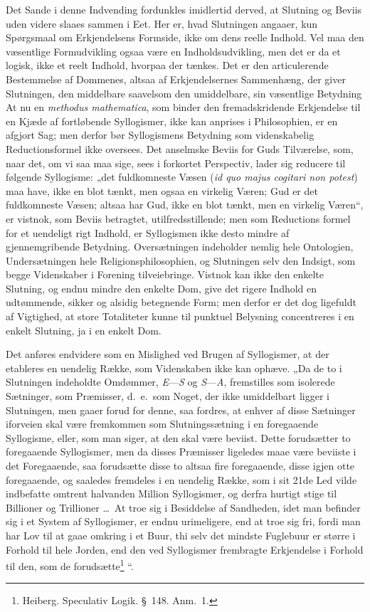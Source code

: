 \documentclass[12pt]{book}
\newcommand{\opage}[1]{\marginnote{\footnotesize\textit{[#1]}}}
\begin{document}
Det Sande i denne Indvending fordunkles imidlertid derved, at Slutning og Beviis uden videre slaaes sammen i Eet. Her er, hvad Slutningen angaaer, kun Spørgsmaal om Erkjendelsens Formside, ikke om dens reelle Indhold. Vel maa den væsentlige Formudvikling ogsaa være en Indholdsudvikling, men det er da et logisk, ikke et reelt Indhold, hvorpaa der tænkes. Det er den articulerende Bestemmelse af Dommenes, altsaa af Erkjendelsernes Sammenhæng, der giver Slutningen, den middelbare saavelsom den umiddelbare, sin væsentlige Betydning At nu%
{} en \textit{methodus mathematica}, som binder den fremadskridende Erkjendelse til en Kjæde af fortløbende Syllogismer, ikke kan anprises i Philosophien, er en afgjort Sag; men derfor bør Syllogismens Betydning som videnskabelig Reductionsformel ikke oversees. Det anselmske Beviis for Guds Tilværelse, som, naar det, om vi saa maa sige, sees i forkortet Perspectiv, lader sig reducere til følgende Syllogisme: „det fuldkomneste Væsen (\textit{id quo majus cogitari non potest}) maa have, ikke en blot tænkt, men ogsaa en virkelig Væren; Gud er det fuldkomneste Væsen; altsaa har Gud, ikke en blot tænkt, men en virkelig Væren“, er vistnok, som Beviis betragtet, utilfredsstillende; men som Reductions%
\opage{326}formel for et uendeligt rigt Indhold, er Syllogismen ikke desto mindre af gjennemgribende Betydning. Oversætningen indeholder nemlig hele Ontologien, Undersætningen hele Religionsphilosophien, og Slutningen selv den Indsigt, som begge Videnskaber i Forening tilveiebringe. Vistnok kan ikke den enkelte Slutning, og endnu mindre den enkelte Dom, give det rigere Indhold en udtømmende, sikker og alsidig betegnende Form; men derfor er det dog ligefuldt af Vigtighed, at store Totaliteter kunne til punktuel Belysning concentreres i en enkelt Slutning, ja i en enkelt Dom.

Det anføres endvidere som en Mislighed ved Brugen af Syllogismer, at der etableres en uendelig Række, som Videnskaben ikke kan ophæve. „Da de to i Slutningen indeholdte Omdømmer, %
 \textit{E}---\textit{S} og \textit{S}---\textit{A}, fremstilles som isolerede Sætninger, som Præmisser, d.\ e.\ som Noget, der ikke umiddelbart ligger i Slutningen, men gaaer forud for denne, saa fordres, at enhver af disse Sætninger iforveien skal være fremkommen som Slutningssætning i en foregaaende Syllogisme, eller, som man siger, at den skal være beviist. Dette forudsætter to foregaaende Syllogismer, men da disses Præmisser ligeledes maae være beviiste i det Foregaaende, saa forudsætte disse to altsaa fire foregaaende, disse igjen otte foregaaende, og saaledes fremdeles i en uendelig Række, som i sit 21de Led vilde indbefatte omtrent halvanden Million Syllogismer, og derfra hurtigt stige til Billioner og Trillioner \dots\ At troe sig i Besiddelse af Sandheden, idet man befinder sig i et System af Syllogismer, er endnu urimeligere, end at troe sig fri, fordi man har Lov til at gaae omkring i et Buur, thi selv det mindste Fuglebuur er større i Forhold til hele Jorden, end den ved Syllogismer frembragte Erkjendelse i Forhold til den, som de forudsætte\footnote{Heiberg. Speculativ Logik. §~148. Anm.~1.}%
“.
\end{document}
